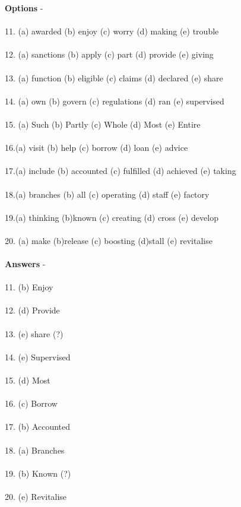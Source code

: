 \documentclass[a4paper,30pt]{report}
\begin{document}
      \textbf{Options} - \\\\
11. (a) awarded (b) enjoy
(c) worry (d) making
(e) trouble\\\\
12. (a) sanctions (b) apply
(c) part (d) provide
(e) giving\\\\
13. (a) function (b) eligible
(c) claims (d) declared
(e) share\\\\
14. (a) own (b) govern
(c) regulations (d) ran
(e) supervised\\\\
15. (a) Such (b) Partly
(c) Whole (d) Most
(e) Entire\\\\
16.(a) visit (b) help
(c) borrow (d) loan
(e) advice\\\\
17.(a) include (b) accounted
(c) fulfilled (d) achieved
(e) taking\\\\
18.(a) branches (b) all
(c) operating (d) staff
(e) factory\\\\
19.(a) thinking (b)known
(c) creating (d) cross
(e) develop\\\\
20. (a) make (b)release
(c) boosting (d)stall
(e) revitalise\\\\

      \textbf{Answers} - \\\\
11. (b) Enjoy\\\\
12. (d) Provide\\\\
13. (e) share (?)\\\\
14. (e) Supervised\\\\
15. (d) Most\\\\
16. (c) Borrow\\\\
17. (b) Accounted\\\\
18. (a) Branches\\\\
19. (b) Known (?)\\\\
20. (e) Revitalise\\\\
\end{document}
